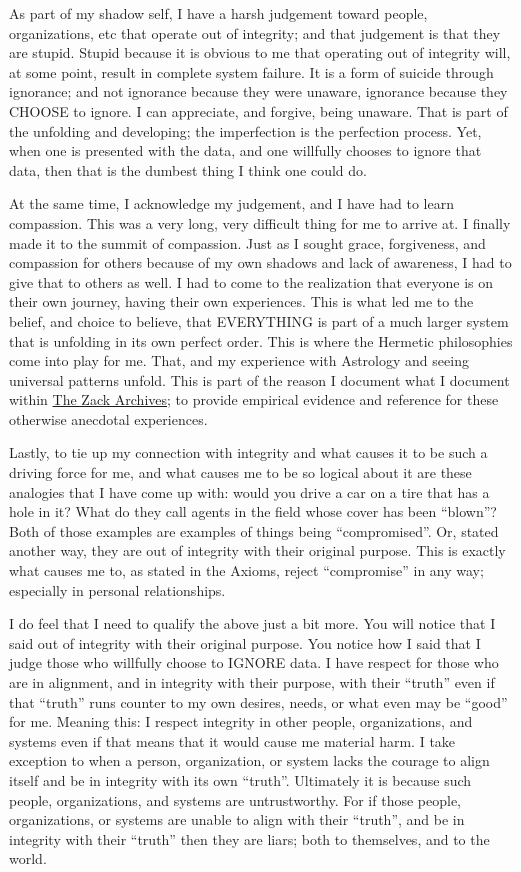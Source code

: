 \documentclass{article}
\begin{document}
As part of my shadow self, I have a harsh judgement toward people, organizations, etc that operate out of integrity; and that judgement is that they are stupid. Stupid because it is obvious to me that operating out of integrity will, at some point, result in complete system failure. It is a form of suicide through ignorance; and not ignorance because they were unaware, ignorance because they CHOOSE to ignore. I can appreciate, and forgive, being unaware. That is part of the unfolding and developing; the imperfection is the perfection process. Yet, when one is presented with the data, and one willfully chooses to ignore that data, then that is the dumbest thing I think one could do.

At the same time, I acknowledge my judgement, and I have had to learn compassion. This was a very long, very difficult thing for me to arrive at. I finally made it to the summit of compassion. Just as I sought grace, forgiveness, and compassion for others because of my own shadows and lack of awareness, I had to give that to others as well. I had to come to the realization that everyone is on their own journey, having their own experiences. This is what led me to the belief, and choice to believe, that EVERYTHING is part of a much larger system that is unfolding in its own perfect order. This is where the Hermetic philosophies come into play for me. That, and my experience with Astrology and seeing universal patterns unfold. This is part of the reason I document what I document within \hyperlink{gloss:the_zack_archives}{The Zack Archives}; to provide empirical evidence and reference for these otherwise anecdotal experiences.

Lastly, to tie up my connection with integrity and what causes it to be such a driving force for me, and what causes me to be so logical about it are these analogies that I have come up with: would you drive a car on a tire that has a hole in it? What do they call agents in the field whose cover has been ``blown''? Both of those examples are examples of things being ``compromised''. Or, stated another way, they are out of integrity with their original purpose. This is exactly what causes me to, as stated in the Axioms, reject ``compromise'' in any way; especially in personal relationships.

I do feel that I need to qualify the above just a bit more. You will notice that I said out of integrity with their original purpose. You notice how I said that I judge those who willfully choose to IGNORE data. I have respect for those who are in alignment, and in integrity with their purpose, with their ``truth'' even if that ``truth'' runs counter to my own desires, needs, or what even may be ``good'' for me. Meaning this: I respect integrity in other people, organizations, and systems even if that means that it would cause me material harm. I take exception to when a person, organization, or system lacks the courage to align itself and be in integrity with its own ``truth''. Ultimately it is because such people, organizations, and systems are untrustworthy. For if those people, organizations, or systems are unable to align with their ``truth'', and be in integrity with their ``truth'' then they are liars; both to themselves, and to the world.
\end{document}
